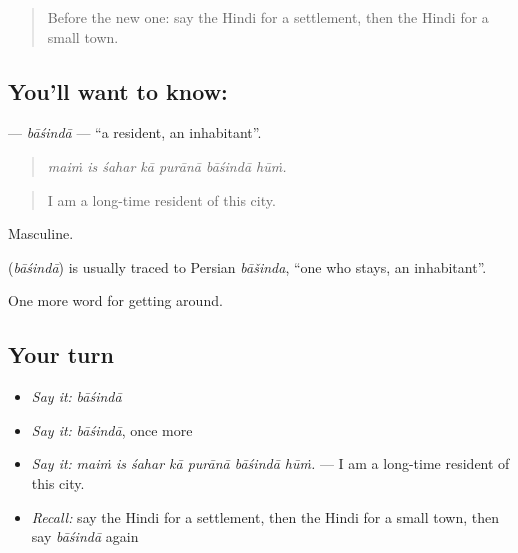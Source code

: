 \label{lesson:HI-C421-basinda}



\begin{quote}
Before the new one: say the Hindi for a settlement, then the Hindi for a small town.
\end{quote}

\subsection*{You'll want to know: }
\textbf{} — \emph{bāśindā} — \textquotedblleft{}a resident, an inhabitant\textquotedblright{}.

\begin{quote}
      
\end{quote}

\begin{quote}
\emph{maiṁ is śahar kā purānā bāśindā hūṁ.}
\end{quote}

\begin{quote}
I am a long-time resident of this city.
\end{quote}

Masculine.

\begin{cousinweb}
\textbf{} (\emph{bāśindā}) is usually traced to Persian \emph{bāšinda}, \textquotedblleft{}one who stays, an inhabitant\textquotedblright{}.
\end{cousinweb}

\begin{grammarlens}[title={What you've built}]
One more word for getting around.
\end{grammarlens}

\subsection*{Your turn}
\begin{itemize}
\raggedright
  \item \emph{Say it:} \emph{bāśindā}
  \item \emph{Say it:} \emph{bāśindā}, once more
  \item \emph{Say it:} \emph{maiṁ is śahar kā purānā bāśindā hūṁ.} — I am a long-time resident of this city.
  \item \emph{Recall:} say the Hindi for a settlement, then the Hindi for a small town, then say \emph{bāśindā} again
\end{itemize}

